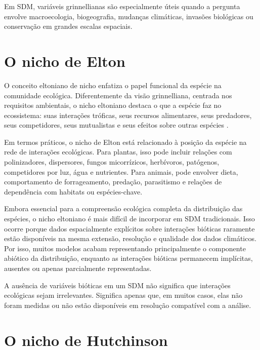 \documentclass{ueap-sdm}
\begin{document}
\begin{dica}[title={\faLightbulb\quad dica}]
Em SDM, variáveis grinnellianas são especialmente úteis quando a pergunta envolve macroecologia, biogeografia, mudanças climáticas, invasões biológicas ou conservação em grandes escalas espaciais.
\end{dica}

\section{O nicho de Elton}

O conceito eltoniano de nicho enfatiza o papel funcional da espécie na comunidade ecológica. Diferentemente da visão grinnelliana, centrada nos requisitos ambientais, o nicho eltoniano destaca o que a espécie faz no ecossistema: suas interações tróficas, seus recursos alimentares, seus predadores, seus competidores, seus mutualistas e seus efeitos sobre outras espécies \parencite{elton1927,soberon2007}.

Em termos práticos, o nicho de Elton está relacionado à posição da espécie na rede de interações ecológicas. Para plantas, isso pode incluir relações com polinizadores, dispersores, fungos micorrízicos, herbívoros, patógenos, competidores por luz, água e nutrientes. Para animais, pode envolver dieta, comportamento de forrageamento, predação, parasitismo e relações de dependência com habitats ou espécies-chave.

Embora essencial para a compreensão ecológica completa da distribuição das espécies, o nicho eltoniano é mais difícil de incorporar em SDM tradicionais. Isso ocorre porque dados espacialmente explícitos sobre interações bióticas raramente estão disponíveis na mesma extensão, resolução e qualidade dos dados climáticos. Por isso, muitos modelos acabam representando principalmente o componente abiótico da distribuição, enquanto as interações bióticas permanecem implícitas, ausentes ou apenas parcialmente representadas.

\begin{atencao}[title={\faExclamationTriangle\quad atenção}]
A ausência de variáveis bióticas em um SDM não significa que interações ecológicas sejam irrelevantes. Significa apenas que, em muitos casos, elas não foram medidas ou não estão disponíveis em resolução compatível com a análise.
\end{atencao}

\section{O nicho de Hutchinson}
\end{document}
